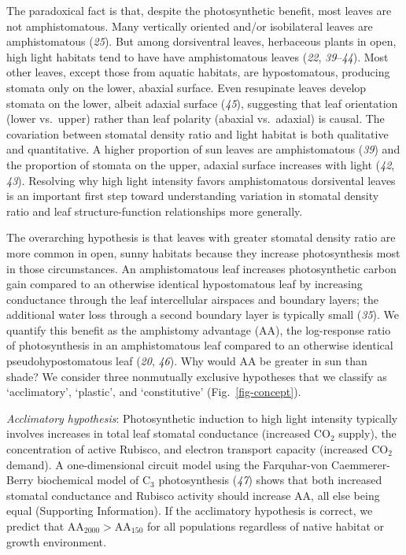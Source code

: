 \documentclass[
  letterpaper,
  DIV=11,
  numbers=noendperiod]{scrartcl}
\newcommand{\aahigh}{\mathrm{AA}_{2000}}
\newcommand{\aalow}{\mathrm{AA}_{150}}
\newcommand{\aax}{$\mathrm{AA}$}
\begin{document}
The paradoxical fact is that, despite the photosynthetic benefit, most
leaves are not amphistomatous. Many vertically oriented and/or
isobilateral leaves are amphistomatous (\emph{25}). But among
dorsiventral leaves, herbaceous plants in open, high light habitats tend
to have have amphistomatous leaves (\emph{22}, \emph{39}--\emph{44}).
Most other leaves, except those from aquatic habitats, are
hypostomatous, producing stomata only on the lower, abaxial surface.
Even resupinate leaves develop stomata on the lower, albeit adaxial
surface (\emph{45}), suggesting that leaf orientation (lower vs.~upper)
rather than leaf polarity (abaxial vs.~adaxial) is causal. The
covariation between stomatal density ratio and light habitat is both
qualitative and quantitative. A higher proportion of sun leaves are
amphistomatous (\emph{39}) and the proportion of stomata on the upper,
adaxial surface increases with light (\emph{42}, \emph{43}). Resolving
why high light intensity favors amphistomatous dorsivental leaves is an
important first step toward understanding variation in stomatal density
ratio and leaf structure-function relationships more generally.

The overarching hypothesis is that leaves with greater stomatal density
ratio are more common in open, sunny habitats because they increase
photosynthesis most in those circumstances. An amphistomatous leaf
increases photosynthetic carbon gain compared to an otherwise identical
hypostomatous leaf by increasing conductance through the leaf
intercellular airspaces and boundary layers; the additional water loss
through a second boundary layer is typically small (\emph{35}). We
quantify this benefit as the amphistomy advantage (\aax{}), the
log-response ratio of photosynthesis in an amphistomatous leaf compared
to an otherwise identical pseudohypostomatous leaf (\emph{20},
\emph{46}). Why would \aax{} be greater in sun than shade? We consider
three nonmutually exclusive hypotheses that we classify as
`acclimatory', `plastic', and `constitutive' (Fig.~\ref{fig-concept}).

\emph{Acclimatory hypothesis}: Photosynthetic induction to high light
intensity typically involves increases in total leaf stomatal
conductance (increased CO\(_2\) supply), the concentration of active
Rubisco, and electron transport capacity (increased CO\(_2\) demand). A
one-dimensional circuit model using the Farquhar-von Caemmerer-Berry
biochemical model of C\(_3\) photosynthesis (\emph{47}) shows that both
increased stomatal conductance and Rubisco activity should increase
\aax{}, all else being equal (Supporting Information). If the
acclimatory hypothesis is correct, we predict that
\(\aahigh{} > \aalow{}\) for all populations regardless of native
habitat or growth environment.
\end{document}
